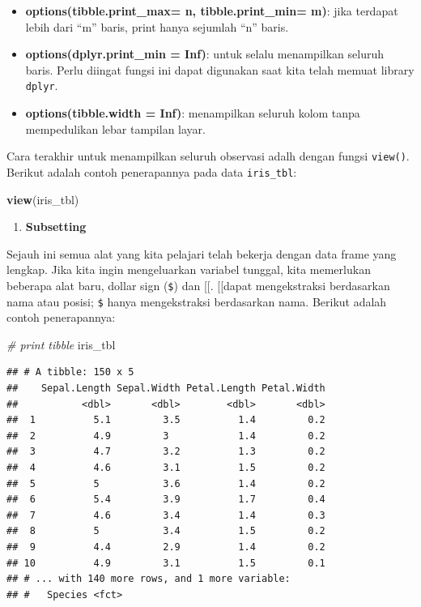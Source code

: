 \documentclass[]{book}
\newenvironment{Shaded}{\begin{snugshade}}{\end{snugshade}}
\newcommand{\KeywordTok}[1]{\textcolor[rgb]{0.13,0.29,0.53}{\textbf{#1}}}
\newcommand{\CommentTok}[1]{\textcolor[rgb]{0.56,0.35,0.01}{\textit{#1}}}
\newcommand{\NormalTok}[1]{#1}
\providecommand{\tightlist}{%
  \setlength{\itemsep}{0pt}\setlength{\parskip}{0pt}}
\begin{document}
\begin{itemize}
\tightlist
\item
  \textbf{options(tibble.print\_max= n, tibble.print\_min= m)}: jika
  terdapat lebih dari ``m'' baris, print hanya sejumlah ``n'' baris.
\item
  \textbf{options(dplyr.print\_min = Inf)}: untuk selalu menampilkan
  seluruh baris. Perlu diingat fungsi ini dapat digunakan saat kita
  telah memuat library \texttt{dplyr}.
\item
  \textbf{options(tibble.width = Inf)}: menampilkan seluruh kolom tanpa
  mempedulikan lebar tampilan layar.
\end{itemize}

Cara terakhir untuk menampilkan seluruh observasi adalh dengan fungsi
\texttt{view()}. Berikut adalah contoh penerapannya pada data
\texttt{iris\_tbl}:

\begin{Shaded}
\begin{Highlighting}[]
\KeywordTok{view}\NormalTok{(iris_tbl)}
\end{Highlighting}
\end{Shaded}

\begin{enumerate}
\def\labelenumi{\alph{enumi}.}
\setcounter{enumi}{1}
\tightlist
\item
  \textbf{Subsetting}
\end{enumerate}

Sejauh ini semua alat yang kita pelajari telah bekerja dengan data frame
yang lengkap. Jika kita ingin mengeluarkan variabel tunggal, kita
memerlukan beberapa alat baru, dollar sign (\texttt{\$}) dan {[}{[}.
{[}{[}dapat mengekstraksi berdasarkan nama atau posisi; \texttt{\$}
hanya mengekstraksi berdasarkan nama. Berikut adalah contoh
penerapannya:

\begin{Shaded}
\begin{Highlighting}[]
\CommentTok{# print tibble}
\NormalTok{iris_tbl}
\end{Highlighting}
\end{Shaded}

\begin{verbatim}
## # A tibble: 150 x 5
##    Sepal.Length Sepal.Width Petal.Length Petal.Width
##           <dbl>       <dbl>        <dbl>       <dbl>
##  1          5.1         3.5          1.4         0.2
##  2          4.9         3            1.4         0.2
##  3          4.7         3.2          1.3         0.2
##  4          4.6         3.1          1.5         0.2
##  5          5           3.6          1.4         0.2
##  6          5.4         3.9          1.7         0.4
##  7          4.6         3.4          1.4         0.3
##  8          5           3.4          1.5         0.2
##  9          4.4         2.9          1.4         0.2
## 10          4.9         3.1          1.5         0.1
## # ... with 140 more rows, and 1 more variable:
## #   Species <fct>
\end{verbatim}
\end{document}
